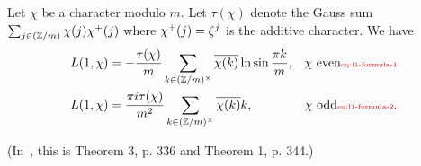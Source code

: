 \begin{thm}
Let $\chi$ be a character modulo $m$. 
Let $\tau(\chi)$ denote the Gauss sum $\sum_{j\in (\mathbb{Z}/m)}\chi(j)\chi^+(j)$ where $\chi^+(j)=\zeta^j$ is the additive character. 
We have
\begin{align}
L(1,\chi)&=%
-\fc{\tau(\chi)}{m}\sum_{k\in (\Z/m)^{\times}} \ol{\chi(k)}\ln \sin \fc{\pi k}{m}%
,&\chi\text{ even}\llabel{eq:l1-formula-1}\\
L(1,\chi)&=
\fc{\pi i \tau(\chi)}{m^2}\sum_{k\in (\Z/m)^{\times}} \ol{\chi(k)} k,&\chi\text{ odd}\llabel{eq:l1-formula-2}.
\end{align}
\end{thm}
(In~\cite{BS66}, this is Theorem 3, p. 336 and Theorem 1, p. 344.)
